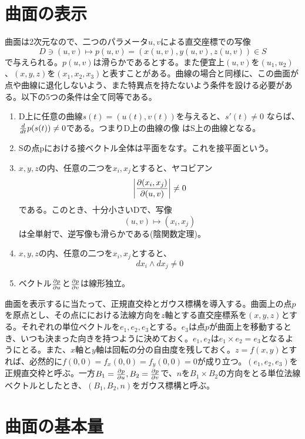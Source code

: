     \section{曲面の表示}
        曲面は2次元なので、二つのパラメータ$u,v$による直交座標での写像
            \[D\ni (u,v)\longmapsto p(u,v) = (x(u,v),y(u,v),z(u,v))\in S\]
        で与えられる。$p(u,v)$は滑らかであるとする。また便宜上$(u,v)$を$(u_1,u_2)$、$(x,y,z)$を$(x_1,x_2,x_3)$と表すことがある。曲線の場合と同様に、この曲面が点や曲線に退化しないよう、また特異点を持たないよう条件を設ける必要がある。以下の5つの条件は全て同等である。
        \begin{enumerate}
            \item D上に任意の曲線$s(t)=(u(t),v(t))$を与えると、$s'(t)\neq 0$
                  ならば、$\di{t}p(s(t))\neq 0$である。つまりD上の曲線の像
                  はS上の曲線となる。
            \item Sの点pにおける接ベクトル全体は平面をなす。これを接平面という。
            \item $x,y,z$の内、任意の二つを$x_i,x_j$とすると、ヤコビアン
                      \[\left|\pd[(x_i,x_j)]{(u,v)}\right|\neq 0\]
                  である。このとき、十分小さいDで、写像
                      \[(u,v)\longmapsto (x_i,x_j)\]
                  は全単射で、逆写像も滑らかである(陰関数定理)。
            \item $x,y,z$の内、任意の二つを$x_i,x_j$とすると、
                      \[dx_i\wedge dx_j\neq 0\]
            \item ベクトル$\pd[p]{u}$と$\pd[p]{v}$は線形独立。
        \end{enumerate}
        曲面を表示するに当たって、正規直交枠とガウス標構を導入する。曲面上の点$p$を原点とし、その点ににおける法線方向を$z$軸とする直交座標系を$(x,y,z)$とする。それぞれの単位ベクトルを$e_1,e_2,e_3$とする。$e_3$は点$p$が曲面上を移動するとき、いつも決まった向きを持つように決めておく。$e_1,e_2$は$e_1\times e_2 = e_3$となるようにとる。また、$x$軸と$y$軸は回転の分の自由度を残しておく。$z=f(x,y)$とすれば、必然的に$f(0,0)=f_x(0,0)=f_y(0,0)=0$が成り立つ。$(e_1,e_2,e_3)$を正規直交枠と呼ぶ。一方$B_1=\pd[p]{u},B_2=\pd[p]{v}$で、$n$を$B_1\times B_2$の方向をとる単位法線ベクトルとしたとき、$(B_1,B_2,n)$をガウス標構と呼ぶ。

    \section{曲面の基本量}
